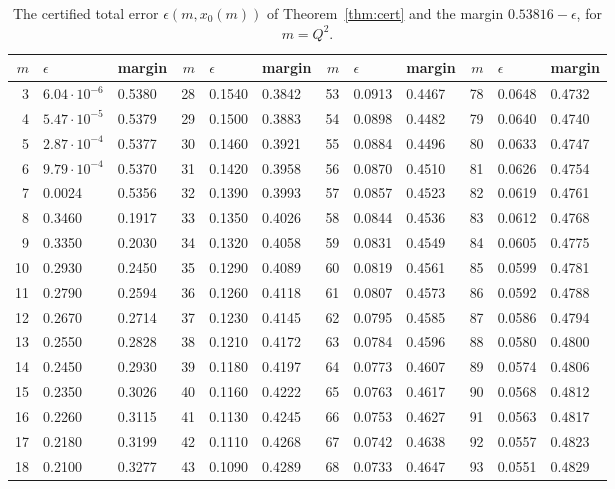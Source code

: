 \begin{table}[ht]
\centering
\footnotesize
\setlength{\tabcolsep}{3.5pt}
\caption{The certified total error $\epsilon(m,x_0(m))$ of Theorem~\ref{thm:cert} and the margin $0.53816-\epsilon$, for $m=Q^2$.}\label{tab:margins}
\begin{tabular}{rll|rll|rll|rll}
\hline
$m$ & $\epsilon$ & margin & $m$ & $\epsilon$ & margin & $m$ & $\epsilon$ & margin & $m$ & $\epsilon$ & margin \\
\hline
3 & $6.04\cdot10^{-6}$ & 0.5380 & 28 & 0.1540 & 0.3842 & 53 & 0.0913 & 0.4467 & 78 & 0.0648 & 0.4732 \\
4 & $5.47\cdot10^{-5}$ & 0.5379 & 29 & 0.1500 & 0.3883 & 54 & 0.0898 & 0.4482 & 79 & 0.0640 & 0.4740 \\
5 & $2.87\cdot10^{-4}$ & 0.5377 & 30 & 0.1460 & 0.3921 & 55 & 0.0884 & 0.4496 & 80 & 0.0633 & 0.4747 \\
6 & $9.79\cdot10^{-4}$ & 0.5370 & 31 & 0.1420 & 0.3958 & 56 & 0.0870 & 0.4510 & 81 & 0.0626 & 0.4754 \\
7 & 0.0024 & 0.5356 & 32 & 0.1390 & 0.3993 & 57 & 0.0857 & 0.4523 & 82 & 0.0619 & 0.4761 \\
8 & 0.3460 & 0.1917 & 33 & 0.1350 & 0.4026 & 58 & 0.0844 & 0.4536 & 83 & 0.0612 & 0.4768 \\
9 & 0.3350 & 0.2030 & 34 & 0.1320 & 0.4058 & 59 & 0.0831 & 0.4549 & 84 & 0.0605 & 0.4775 \\
10 & 0.2930 & 0.2450 & 35 & 0.1290 & 0.4089 & 60 & 0.0819 & 0.4561 & 85 & 0.0599 & 0.4781 \\
11 & 0.2790 & 0.2594 & 36 & 0.1260 & 0.4118 & 61 & 0.0807 & 0.4573 & 86 & 0.0592 & 0.4788 \\
12 & 0.2670 & 0.2714 & 37 & 0.1230 & 0.4145 & 62 & 0.0795 & 0.4585 & 87 & 0.0586 & 0.4794 \\
13 & 0.2550 & 0.2828 & 38 & 0.1210 & 0.4172 & 63 & 0.0784 & 0.4596 & 88 & 0.0580 & 0.4800 \\
14 & 0.2450 & 0.2930 & 39 & 0.1180 & 0.4197 & 64 & 0.0773 & 0.4607 & 89 & 0.0574 & 0.4806 \\
15 & 0.2350 & 0.3026 & 40 & 0.1160 & 0.4222 & 65 & 0.0763 & 0.4617 & 90 & 0.0568 & 0.4812 \\
16 & 0.2260 & 0.3115 & 41 & 0.1130 & 0.4245 & 66 & 0.0753 & 0.4627 & 91 & 0.0563 & 0.4817 \\
17 & 0.2180 & 0.3199 & 42 & 0.1110 & 0.4268 & 67 & 0.0742 & 0.4638 & 92 & 0.0557 & 0.4823 \\
18 & 0.2100 & 0.3277 & 43 & 0.1090 & 0.4289 & 68 & 0.0733 & 0.4647 & 93 & 0.0551 & 0.4829 \\

\end{tabular}
\end{table}

